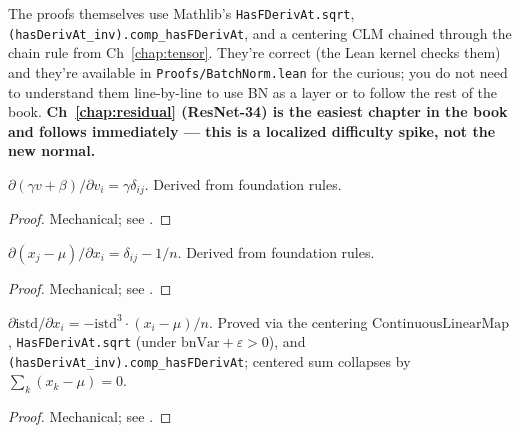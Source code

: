 The proofs themselves use Mathlib's \texttt{HasFDerivAt.sqrt},
\texttt{(hasDerivAt\_inv).comp\_hasFDerivAt}, and a centering CLM
chained through the chain rule from Ch~\ref{chap:tensor}. They're
correct (the Lean kernel checks them) and they're available in
\texttt{Proofs/BatchNorm.lean} for the curious; you do not need to
understand them line-by-line to use BN as a layer or to follow the
rest of the book. \textbf{Ch~\ref{chap:residual} (ResNet-34) is
the easiest chapter in the book and follows immediately --- this
is a localized difficulty spike, not the new normal.}

\begin{theorem}
  \label{ax:pdiv_bnAffine}
  \leanok
  \(\partial (\gamma v + \beta) / \partial v_i = \gamma \delta_{ij}\).
  Derived from foundation rules.
\end{theorem}

\begin{proof}
\leanok
Mechanical; see .
\end{proof}

\begin{theorem}
  \label{ax:pdiv_bnCentered}
  \leanok
  \(\partial (x_j - \mu) / \partial x_i = \delta_{ij} - 1/n\).
  Derived from foundation rules.
\end{theorem}

\begin{proof}
\leanok
Mechanical; see .
\end{proof}

\begin{theorem}
  \label{ax:pdiv_bnIstdBroadcast}
  \leanok
  \(\partial \mathrm{istd}/\partial x_i = -\mathrm{istd}^3 \cdot
  (x_i - \mu)/n\). Proved via the centering \(\mathrm{ContinuousLinearMap}\),
  \texttt{HasFDerivAt.sqrt} (under \(\mathrm{bnVar} + \varepsilon > 0\)),
  and \texttt{(hasDerivAt\_inv).comp\_hasFDerivAt}; centered sum
  collapses by \(\sum_k (x_k - \mu) = 0\).
\end{theorem}

\begin{proof}
\leanok
Mechanical; see .
\end{proof}

